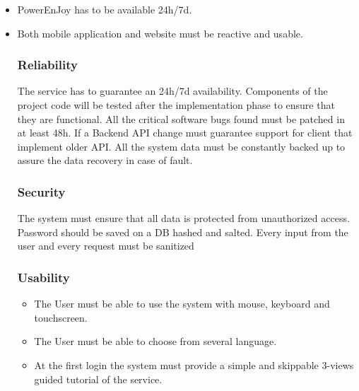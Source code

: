 \begin{itemize}
	\item PowerEnJoy has to be available 24h/7d.
	\item Both mobile application and website must be reactive and usable.
	
\subsubsection{Reliability}%

The service has to guarantee an 24h/7d availability. Components of the project code will be tested after the implementation phase to ensure that they are functional. 
All the critical software bugs found must be patched in at least 48h.
If a Backend API change must guarantee support for client that implement older API.
All the system data must be constantly backed up to assure the data recovery in case of fault.

\subsubsection{Security}

The system must ensure that all data is protected from unauthorized
access. Password should be saved on a DB hashed and salted.
Every input from the user and every request must be sanitized 

\subsubsection{Usability}
\begin{itemize}
	\item The User must be able to use the system with mouse, keyboard and touchscreen.
	\item The User must be able to choose from several language.
	\item At the first login the system must provide a simple and skippable 3-views guided tutorial of the service.
\end{itemize}
\end{itemize}

